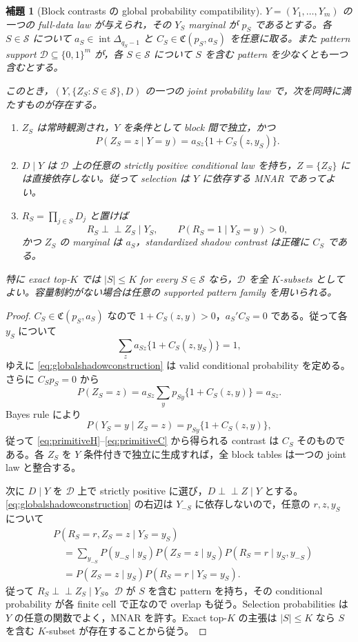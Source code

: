 \documentclass[11pt,a4paper]{ltjsarticle}
\newtheorem{lemma}{補題}[section]
\theoremstyle{remark}
\newcommand{\ind}{\perp\!\!\!\perp}
\newcommand{\cS}{\mathcal S}
\begin{document}
\begin{lemma}[Block contrasts の global probability compatibility]\label{lem:globalcompatibility}
$Y=(Y_1,\ldots,Y_m)$ の一つの full-data law が与えられ，その $Y_S$ marginal が $p_S$ であるとする。各 $S\in\cS$ について $a_S\in\operatorname{int}\Delta_{q_S-1}$ と
$C_S\in\mathfrak C(p_S,a_S)$ を任意に取る。また pattern support $\mathcal D\subseteq\{0,1\}^m$ が，各 $S\in\cS$ について $S$ を含む pattern を少なくとも一つ含むとする。

このとき，$(Y,\{Z_S:S\in\cS\},D)$ の一つの joint probability law で，次を同時に満たすものが存在する。
\begin{enumerate}[label=(\roman*)]
\item $Z_S$ は常時観測され，$Y$ を条件として block 間で独立，かつ
\begin{equation}
P(Z_S=z\mid Y=y)
=a_{Sz}\{1+C_S(z,y_S)\}.
\label{eq:globalshadowconstruction}
\end{equation}
\item $D\mid Y$ は $\mathcal D$ 上の任意の strictly positive conditional law を持ち，$Z=\{Z_S\}$ には直接依存しない。従って selection は $Y$ に依存する MNAR であってよい。
\item $R_S=\prod_{j\in S}D_j$ と置けば
\[
R_S\ind Z_S\mid Y_S,
\qquad
P(R_S=1\mid Y_S=y)>0,
\]
かつ $Z_S$ の marginal は $a_S$，standardized shadow contrast は正確に $C_S$ である。
\end{enumerate}
特に exact top-$K$ では $|S|\le K$ for every $S\in\cS$ なら，$\mathcal D$ を全 $K$-subsets としてよい。容量制約がない場合は任意の supported pattern family を用いられる。
\end{lemma}

\begin{proof}
$C_S\in\mathfrak C(p_S,a_S)$ なので $1+C_S(z,y)>0$，$a_S'C_S=0$ である。従って各 $y_S$ について
\[
\sum_z a_{Sz}\{1+C_S(z,y_S)\}=1,
\]
ゆえに \eqref{eq:globalshadowconstruction} は valid conditional probability を定める。さらに $C_Sp_S=0$ から
\[
P(Z_S=z)
=a_{Sz}\sum_y p_{Sy}\{1+C_S(z,y)\}
=a_{Sz}.
\]
Bayes rule により
\[
P(Y_S=y\mid Z_S=z)
=p_{Sy}\{1+C_S(z,y)\},
\]
従って \eqref{eq:primitiveH}--\eqref{eq:primitiveC} から得られる contrast は $C_S$ そのものである。各 $Z_S$ を $Y$ 条件付きで独立に生成すれば，全 block tables は一つの joint law と整合する。

次に $D\mid Y$ を $\mathcal D$ 上で strictly positive に選び，$D\ind Z\mid Y$ とする。\eqref{eq:globalshadowconstruction} の右辺は $Y_{-S}$ に依存しないので，任意の $r,z,y_S$ について
\begin{align*}
&P(R_S=r,Z_S=z\mid Y_S=y_S)\\
&\quad=\sum_{y_{-S}}P(y_{-S}\mid y_S)
 P(Z_S=z\mid y_S)
 P(R_S=r\mid y_S,y_{-S})\\
&\quad=P(Z_S=z\mid y_S)P(R_S=r\mid Y_S=y_S).
\end{align*}
従って $R_S\ind Z_S\mid Y_S$。$\mathcal D$ が $S$ を含む pattern を持ち，その conditional probability が各 finite cell で正なので overlap も従う。Selection probabilities は $Y$ の任意の関数でよく，MNAR を許す。Exact top-$K$ の主張は $|S|\le K$ なら $S$ を含む $K$-subset が存在することから従う。
\end{proof}
\end{document}
